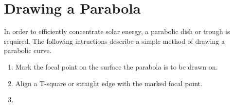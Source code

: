\documentclass[titlepage]{article}
\begin{document}
    \section{Drawing a Parabola}
        In order to efficiently concentrate solar energy, a parabolic dish or trough is required.  The following intructions describe a simple method of drawing a parabolic curve.\cite{Parabola}
        \begin{enumerate}
            \item \begin{minipage}[t]{\linewidth}
                \raggedright
      
                \medskip
                Mark the focal point on the surface the parabola is to be drawn on.
            \end{minipage}
            \item \begin{minipage}[t]{\linewidth}
            \raggedright
  
            \medskip
            Align a T-square or straight edge with the marked focal point.
            \end{minipage}
            \item \begin{minipage}[t]{\linewidth}
                \raggedright


\end{minipage}
\end{enumerate}
\end{document}
